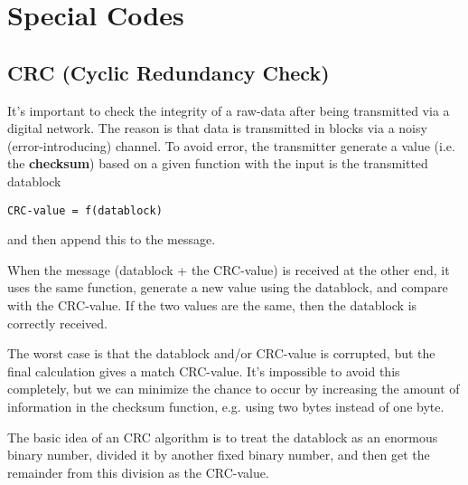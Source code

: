\chapter{Special Codes}
\label{chap:special_code}


\section{CRC (Cyclic Redundancy Check)}
\label{sec:CRC}

It's important to check the integrity of a raw-data after being transmitted via
a digital network. The reason is that data is transmitted in blocks via a noisy
(error-introducing) channel. To avoid error, the transmitter generate a value
(i.e. the {\bf checksum}) based on a given function with the input is the
transmitted datablock
\begin{verbatim}
CRC-value = f(datablock)
\end{verbatim}
and then append this to the message. 

When the message (datablock + the CRC-value) is received at the other end, it
uses the same function, generate a new value using the datablock, and compare
with the CRC-value. If the two values are the same, then the datablock is
correctly received.

The worst case is that the datablock and/or CRC-value is corrupted, but the
final calculation gives a match CRC-value. It's impossible to avoid this
completely, but we can minimize the chance to occur by increasing the amount of
information in the checksum function, e.g. using two bytes instead of one byte. 

The basic idea of an CRC algorithm is to treat the datablock as an enormous
binary number, divided it by another fixed binary number, and then get the
remainder from this division as the CRC-value.


